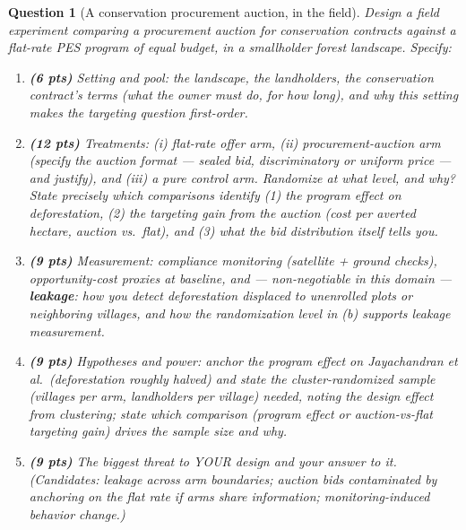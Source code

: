 \documentclass[11pt]{article}
\newtheorem{question}{Question}
\begin{document}
\begin{question}[A conservation procurement auction, in the field]
Design a field experiment comparing a \emph{procurement auction} for
conservation contracts against a \emph{flat-rate} PES program of equal
budget, in a smallholder forest landscape. Specify:
\begin{enumerate}[label=(\alph*)]
  \item \textbf{(6 pts)} Setting and pool: the landscape, the
        landholders, the conservation contract's terms (what the owner
        must do, for how long), and why this setting makes the
        targeting question first-order.
  \item \textbf{(12 pts)} Treatments: (i) flat-rate offer arm, (ii)
        procurement-auction arm (specify the auction format --- sealed
        bid, discriminatory or uniform price --- and justify), and
        (iii) a pure control arm. Randomize at what level, and why?
        State precisely which comparisons identify (1) the program
        effect on deforestation, (2) the targeting gain from the
        auction (cost per averted hectare, auction vs.\ flat), and
        (3) what the bid distribution itself tells you.
  \item \textbf{(9 pts)} Measurement: compliance monitoring (satellite
        + ground checks), opportunity-cost proxies at baseline, and ---
        non-negotiable in this domain --- \textbf{leakage}: how you
        detect deforestation displaced to unenrolled plots or
        neighboring villages, and how the randomization level in (b)
        supports leakage measurement.
  \item \textbf{(9 pts)} Hypotheses and power: anchor the program
        effect on Jayachandran et al.\ (deforestation roughly halved)
        and state the cluster-randomized sample (villages per arm,
        landholders per village) needed, noting the design effect from
        clustering; state which comparison (program effect or
        auction-vs-flat targeting gain) drives the sample size and
        why.
  \item \textbf{(9 pts)} The biggest threat to YOUR design and your
        answer to it. (Candidates: leakage across arm boundaries;
        auction bids contaminated by anchoring on the flat rate if
        arms share information; monitoring-induced behavior change.)
\end{enumerate}
\end{question}

\end{document}

